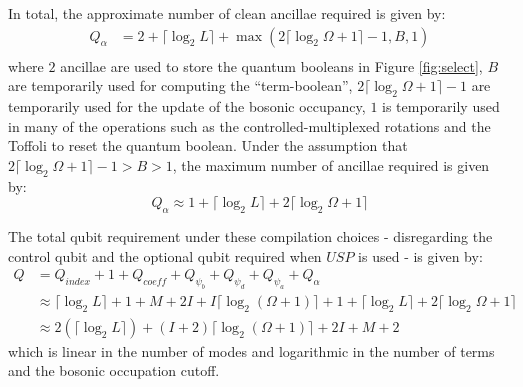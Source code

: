 In total, the approximate number of clean ancillae required is given by:
\begin{equation}
    \begin{split}
        Q_\alpha &= 2 + \lceil \log_2{L} \rceil + \max{(2 \lceil \log_2{\Omega + 1} \rceil - 1, B, 1)} \\ 
    \end{split}
\end{equation}
where $2$ ancillae are used to store the quantum booleans in Figure \ref{fig:select}, $B$ are temporarily used for computing the ``term-boolean'', $2 \lceil \log_2{\Omega + 1} \rceil - 1$ are temporarily used for the update of the bosonic occupancy, $1$ is temporarily used in many of the operations such as the controlled-multiplexed rotations and the Toffoli to reset the quantum boolean.
Under the assumption that $2 \lceil \log_2{\Omega + 1} \rceil - 1 > B > 1$, the maximum number of ancillae required is given by:
\begin{equation}
    Q_\alpha \approx 1 + \lceil \log_2{L} \rceil + 2 \lceil \log_2{\Omega + 1} \rceil
\end{equation}

The total qubit requirement under these compilation choices - disregarding the control qubit and the optional qubit required when $USP$ is used - is given by:
\begin{equation}
    \begin{split}
        Q &= Q_{\textit{index}} + 1 + Q_{\textit{coeff}} + Q_{\psi_b} + Q_{\psi_d} + Q_{\psi_a} + Q_\alpha \\
        &\approx \lceil \log_2{L} \rceil + 1 + M + 2I + I\lceil \log_2{(\Omega + 1)} \rceil + 1 + \lceil \log_2{L} \rceil + 2 \lceil \log_2{\Omega + 1} \rceil \\
        &\approx 2(\lceil \log_2{L} \rceil) + (I + 2)\lceil \log_2{(\Omega + 1)} \rceil + 2I + M + 2
    \end{split}
\end{equation}
which is linear in the number of modes and logarithmic in the number of terms and the bosonic occupation cutoff.

